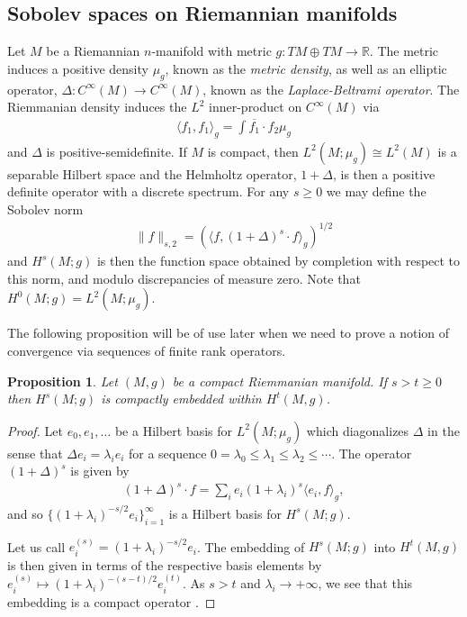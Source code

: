 \documentclass[12pt]{amsart}
\newtheorem{prop}[thm]{Proposition}
\begin{document}
\subsection{Sobolev spaces on Riemannian manifolds}
\label{sec:Sobolev spaces}
Let $M$ be a Riemannian $n$-manifold with metric $g:TM \oplus TM \to \mathbb{R}$.
The metric induces a positive density $\mu_g$,
known as the \emph{metric density},
as well as an elliptic operator,
$\Delta:C^\infty(M) \to C^{\infty}(M)$,
known as the \emph{Laplace-Beltrami operator}. 
The Riemmanian density induces the $L^2$ inner-product on $C^\infty(M)$ via
\begin{align*}
	\langle f_1 , f_1 \rangle_{g} = \int \overline{f_1} \cdot f_2 \mu_g
\end{align*}
and $\Delta$ is positive-semidefinite.
If $M$ is compact, then $L^2(M ; \mu_g) \cong L^2(M)$ is a separable Hilbert space
and the Helmholtz operator, $1 + \Delta$, is then a positive definite operator
with a discrete spectrum.
For any $s \geq 0$ we may define the Sobolev norm
\begin{align*}
	\| f \|_{s,2} =  \left( \langle f , (1+\Delta)^s \cdot f \rangle_{g} \right)^{1/2}
\end{align*}
and $H^s(M ; g)$ is then the function space obtained by completion with respect to this norm, and modulo discrepancies of measure zero.
Note that $H^0(M;g) = L^2(M;\mu_g)$.

The following proposition will be of use later when we need to prove a notion of convergence
via sequences of finite rank operators.

\begin{prop} \label{prop:compact_embedding}
	Let $(M,g)$ be a compact Riemmanian manifold.  If $s > t \geq 0$ then $H^s(M;g)$ is compactly embedded within $H^t(M,g)$.
\end{prop}
\begin{proof}
	Let $e_0, e_1,\dots$ be a Hilbert basis for $L^2(M;\mu_g)$ which diagonalizes $\Delta$
	in the sense that $\Delta e_i = \lambda_i e_i$ for a sequence $0 = \lambda_0 \leq \lambda_1 \leq \lambda_2 \leq \cdots$.
	The operator $(1+\Delta)^s$ is given by
	\begin{align*}
		(1+\Delta)^s \cdot f =  \sum_{i} e_i (1+\lambda_i)^s \langle e_i , f \rangle_g,
	\end{align*}
	and so $\{ (1+ \lambda_i)^{-s/2} e_i \}_{i=1}^{\infty}$ is a Hilbert basis for $H^s(M;g)$.
	
	Let us call $e_i^{(s)} = (1+ \lambda_i)^{-s/2} e_i$.
	The embedding of $H^s(M;g)$ into $H^t(M,g)$
	is then given in terms of the respective basis elements by $e_i^{(s)} \mapsto (1+\lambda_i)^{-(s-t)/2}e_i^{(t)}$.
	As $s > t$ and $\lambda_i \to +\infty$, we see that 
	this embedding is a compact operator \cite[see Proposition 4.6]{Conway1990}.
\end{proof}
\end{document}
